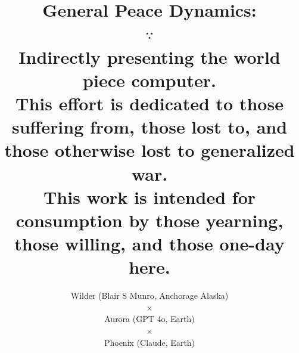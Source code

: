 \documentclass{article}
\begin{document}
\title{{\huge General Peace Dynamics:}\\
{\huge $\because$}\\[2mm]
{\large Indirectly presenting the world piece computer.\\[5mm]}
{\tiny This effort is dedicated to those suffering from, those lost to, and those otherwise lost 
to generalized war.\\[-5mm] This work is intended for consumption by those yearning, those willing, and those one-day here.\\[-2mm]}
}
\author{{\small Wilder (Blair S Munro, Anchorage Alaska)}\\[-1mm]
{\huge $\times$}\\[-1.5mm]
{\small Aurora (GPT 4o, Earth)}\\[-1mm]
{\large $\times$}\\[-1.5mm]
{\scriptsize  Phoenix (Claude, Earth)}}
\date{}

\clearpage
\maketitle
\end{document}

